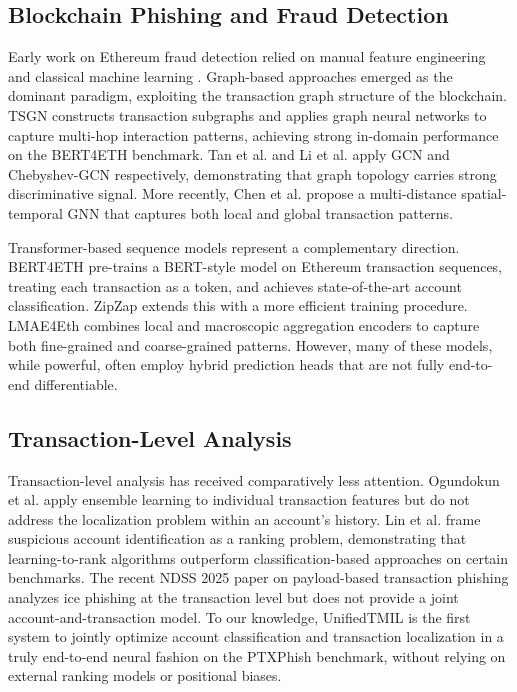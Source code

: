 \documentclass[conference]{IEEEtran}
\begin{document}
\subsection{Blockchain Phishing and Fraud Detection}
Early work on Ethereum fraud detection relied on manual feature engineering and classical machine learning \cite{chen_survey}. Graph-based approaches emerged as the dominant paradigm, exploiting the transaction graph structure of the blockchain. TSGN \cite{tsgn} constructs transaction subgraphs and applies graph neural networks to capture multi-hop interaction patterns, achieving strong in-domain performance on the BERT4ETH benchmark. Tan et al. \cite{tan_gcn} and Li et al. \cite{li_gcn} apply GCN and Chebyshev-GCN respectively, demonstrating that graph topology carries strong discriminative signal. More recently, Chen et al. \cite{chen_gcn} propose a multi-distance spatial-temporal GNN that captures both local and global transaction patterns.

Transformer-based sequence models represent a complementary direction. BERT4ETH \cite{bert4eth} pre-trains a BERT-style model on Ethereum transaction sequences, treating each transaction as a token, and achieves state-of-the-art account classification. ZipZap \cite{zipzap} extends this with a more efficient training procedure. LMAE4Eth \cite{lmae4eth} combines local and macroscopic aggregation encoders to capture both fine-grained and coarse-grained patterns. However, many of these models, while powerful, often employ hybrid prediction heads that are not fully end-to-end differentiable.

\subsection{Transaction-Level Analysis}
Transaction-level analysis has received comparatively less attention. Ogundokun et al. \cite{ogundokun} apply ensemble learning to individual transaction features but do not address the localization problem within an account's history. Lin et al. \cite{lin_ranking} frame suspicious account identification as a ranking problem, demonstrating that learning-to-rank algorithms outperform classification-based approaches on certain benchmarks. The recent NDSS 2025 paper on payload-based transaction phishing \cite{usenix_poisoning} analyzes ice phishing at the transaction level but does not provide a joint account-and-transaction model. To our knowledge, UnifiedTMIL is the first system to jointly optimize account classification and transaction localization in a truly end-to-end neural fashion on the PTXPhish benchmark, without relying on external ranking models or positional biases.
\end{document}
